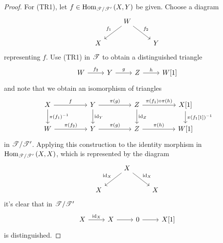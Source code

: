 \documentclass[dissertation.tex]{subfiles}
\begin{document}
\begin{thm}
\begin{proof}
    For (TR1), let $f \in \operatorname{Hom}_{\mathscr{T}/\mathscr{T}^\prime}\left(X,Y\right)$ be given.
    Choose a diagram
    $$\begin{tikzcd}
      & W \arrow[swap]{ld}{f_1}\arrow{rd}{f_2}\\
      X & & Y
    \end{tikzcd}$$
    representing $f$.
    Use (TR1) in $\mathscr{T}$ to obtain a distinguished triangle
    $$\begin{tikzcd}
      W \arrow{r}{f_2} & Y \arrow{r}{g} & Z \arrow{r}{h} & W[1]
    \end{tikzcd}$$
    and note that we obtain an isomorphism of triangles
    $$\begin{tikzcd}
      X \arrow{rr}{f}\arrow{d}{\pi(f_1)^{-1}} && Y \arrow{rr}{\pi(g)}\arrow{d}{\id_Y} && Z \arrow{rr}{\pi(f_1) \circ \pi(h)}\arrow{d}{\id_Z} && X[1]\arrow{d}{\pi(f_1[1])^{-1}}\\
      W \arrow{rr}{\pi(f_2)} && Y \arrow{rr}{\pi(g)} && Z \arrow{rr}{\pi(h)} && W[1]
    \end{tikzcd}$$
    in $\mathscr{T}/\mathscr{T}^\prime$.
    Applying this construction to the identity morphism in $\operatorname{Hom}_{\mathscr{T}/\mathscr{T}^\prime}\left(X,X\right)$, which is represented by the diagram
    $$\begin{tikzcd}
      & X \arrow[swap]{ld}{\id_X}\arrow{rd}{\id_X}\\
      X & & X
    \end{tikzcd}$$
    it's clear that in $\mathscr{T}/\mathscr{T}^\prime$
    $$\begin{tikzcd}
      X \arrow{r}{\id_X} & X \arrow{r} & 0 \arrow{r} & X[1]
    \end{tikzcd}$$
    is distinguished.


\end{proof}
\end{thm}
\end{document}
